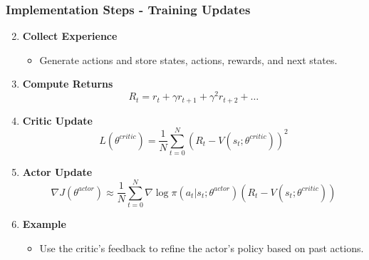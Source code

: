 \documentclass[aspectratio=169]{beamer}
\begin{document}
\begin{frame}[fragile]
    \frametitle{Implementation Steps - Training Updates}
    \begin{enumerate}
        \setcounter{enumi}{1}
        \item \textbf{Collect Experience}
            \begin{itemize}
                \item Generate actions and store states, actions, rewards, and next states.
            \end{itemize}
        \item \textbf{Compute Returns}
            \begin{equation}
            R_t = r_t + \gamma r_{t+1} + \gamma^2 r_{t+2} + \ldots
            \end{equation}
        \item \textbf{Critic Update}
            \begin{equation}
            L(\theta^{critic}) = \frac{1}{N} \sum_{t=0}^{N} (R_t - V(s_t; \theta^{critic}))^2
            \end{equation}
        \item \textbf{Actor Update}
            \begin{equation}
            \nabla J(\theta^{actor}) \approx \frac{1}{N} \sum_{t=0}^{N} \nabla \log \pi(a_t | s_t; \theta^{actor}) (R_t - V(s_t; \theta^{critic}))
            \end{equation}
        \item \textbf{Example}
            \begin{itemize}
                \item Use the critic's feedback to refine the actor's policy based on past actions.
            \end{itemize}
    \end{enumerate}
\end{frame}
\end{document}
